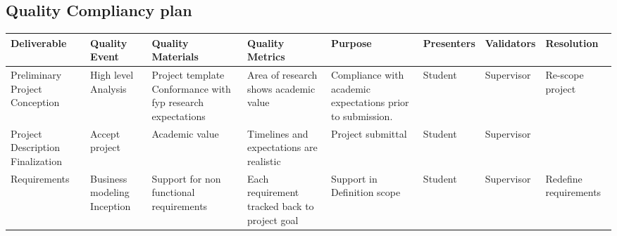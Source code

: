 	\begin{landscape}
		
	\section{Quality Compliancy plan}	 %
		
	\begin{center}

		\begin{tabular}{ | >{\footnotesize}p{25mm} | >{\footnotesize}p{25mm} | >{\footnotesize}p{35mm} | >{\footnotesize}p{35mm} | >{\footnotesize}p{30mm} | >{\footnotesize}p{17mm} | >{\footnotesize}p{15mm} | >{\footnotesize}p{28mm} | }
			\hline

			  \textbf{Deliverable} 
			& \textbf{Quality Event} 	
			& \textbf{Quality Materials} 
			& \textbf{Quality Metrics} 
			& \textbf{Purpose} 	
			& \textbf{Presenters}
			& \textbf{Validators} 
			& \textbf{Resolution}\\ \hline
			
			
			\rowcolor[gray]{.98}
			  Preliminary Project \newline Conception 												
			& High level \newline Analysis					
			& Project template \newline  Conformance with fyp \newline research expectations	
			& Area of research shows academic value	
			& Compliance with \newline academic expectations \newline prior to submission.
			& Student
			& Supervisor
			& Re-scope project		
			\\ \hline
			
			
			  Project \newline Description \newline Finalization 												
			& Accept project					
			& Academic value 	
			& Timelines and expectations are realistic	
			& Project submittal 
			& Student
			& Supervisor
			& 		
			\\ \hline
			
			
			\rowcolor[gray]{.98}
			  Requirements 												
			& Business \newline modeling \newline Inception					
			& Support for non functional requirements 	
			& Each requirement \newline tracked back to \newline project goal  	
			& Support in \newline Definition scope 
			& Student
			& Supervisor
			& Redefine \newline requirements 		
			\\ \hline
			

\end{tabular}
\end{center}
\end{landscape}
